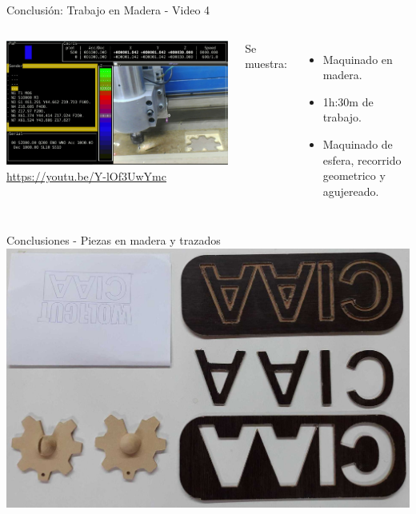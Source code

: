 \documentclass[aspectratio= 43]{beamer}
\begin{document}
\begin{frame}{Conclusión: Trabajo en Madera - Video 4}
   \begin{columns}
   \href{run:./videos/video4.mp4}{
      \includegraphics[width=\textwidth, left]{./videos/shot0004.jpg}
   }
   \href{https://youtu.be/Y-lOf3UwYmc}{https://youtu.be/Y-lOf3UwYmc}

      Se muestra:
      \begin{itemize}
         \item{Maquinado en madera.}
         \item{1h:30m de trabajo.}
         \item{Maquinado de esfera, recorrido geometrico y agujereado.}
      \end{itemize}
   \end{columns}
\end{frame}

\begin{frame}{Conclusiones - Piezas en madera y trazados}
      \includegraphics[width=\textwidth]{./Figures/ciaa_en_madera.jpg}
\end{frame}
\end{document}
